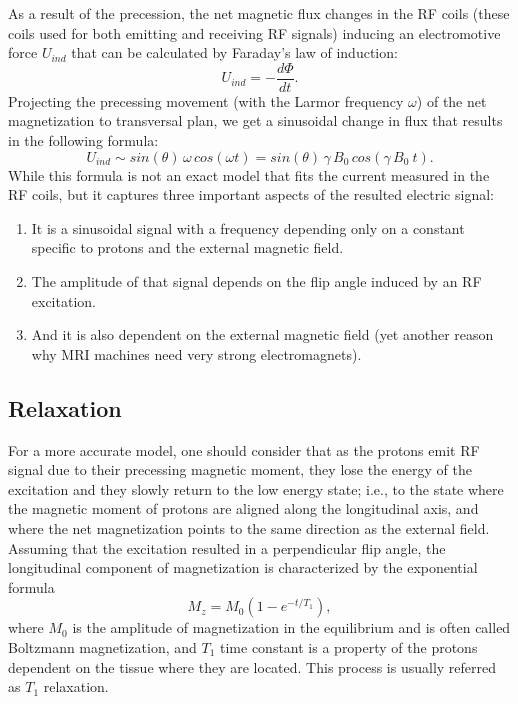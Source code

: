 As a result of the precession, the net magnetic flux changes in the RF coils (these coils used for both emitting and receiving RF signals) inducing an electromotive force $U_{ind}$ that can be calculated by Faraday's law of induction:
\[U_{ind} = -\frac{d\Phi}{dt}.\]
Projecting the precessing movement (with the Larmor frequency $\omega$) of the net magnetization to transversal plan, we get a sinusoidal change in flux that results in the following formula:
\[U_{ind} \sim sin(\theta)\, \omega\, cos(\omega t) = sin(\theta)\, \gamma\, B_0\, cos(\gamma\, B_0\ t).\]
While this formula is not an exact model that fits the current measured in the RF coils, but it captures three important aspects of the resulted electric signal:
\begin{enumerate}
    \item It is a sinusoidal signal with a frequency depending only on a constant specific to protons and the external magnetic field.
    \item The amplitude of that signal depends on the flip angle induced by an RF excitation.
    \item And it is also dependent on the external magnetic field (yet another reason why MRI machines need very strong electromagnets).
\end{enumerate}

\subsection{Relaxation}
For a more accurate model, one should consider that as the protons emit RF signal due to their precessing magnetic moment, they lose the energy of the excitation and they slowly return to the low energy state; i.e., to the state where the magnetic moment of protons are aligned along the longitudinal axis, and where the net magnetization points to the same direction as the external field. Assuming that the excitation resulted in a perpendicular flip angle, the longitudinal component of magnetization is characterized by the exponential formula
\[M_z = M_0 (1 - e^{-t/T_1}),\]
where $M_0$ is the amplitude of magnetization in the equilibrium and is often called Boltzmann magnetization, and $T_1$ time constant is a property of the protons dependent on the tissue where they are located. This process is usually referred as $T_1$ relaxation.

